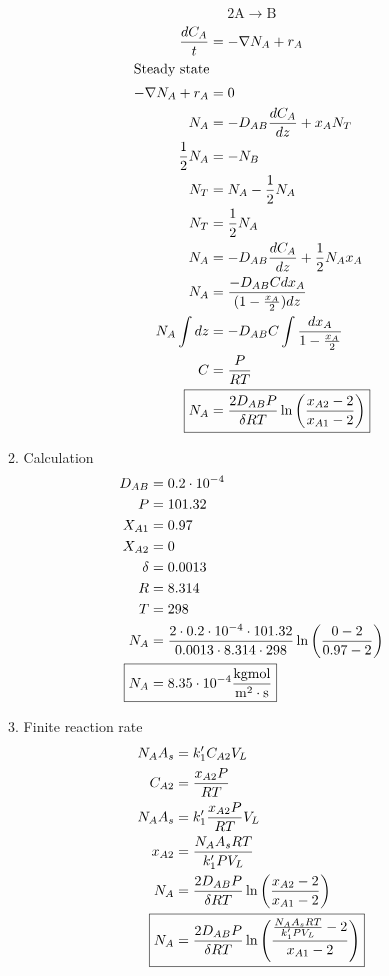 \documentclass[12pt]{article}
\begin{document}
\begin{enumerate}
\begin{enumerate}
        \begin{equation*}
            \mathrm{2A} \rightarrow \mathrm{B}
        \end{equation*}
        \begin{align*}
            \frac{d C_A}{t} &= -\nabla N_A + r_A \\
            \intertext{Steady state}
            -\nabla N_A + r_A &= 0 \\
            N_A &= -D_{AB}\frac{d C_A}{dz} + x_A N_T \\
            \frac{1}{2} N_A &= -N_B \\
            N_T &= N_A - \frac{1}{2} N_A \\
            N_T &= \frac{1}{2} N_A \\
            N_A &= -D_{AB}\frac{d C_A}{dz} + \frac{1}{2} N_A x_A \\
            N_A &= \frac{-D_{AB} C dx_A}{(1-\frac{x_A}{2}) dz} \\
            N_A \int dz &= -D_{AB} C \int \frac{dx_A}{1-\frac{x_A}{2}} \\
            C &= \frac{P}{RT} \\
            \Aboxed{N_A &= \frac{2 D_{AB} P}{\delta R T} \ln\left( \frac{x_{A2} - 2}{x_{A1} - 2} \right)}
        \end{align*}
        
        \item Calculation
        \begin{align*}
            D_{AB} &= 0.2 \cdot 10^{-4} \\
            P &= 101.32 \\
            X_{A1} &= 0.97 \\
            X_{A2} &= 0 \\
            \delta &= 0.0013 \\
            R &= 8.314 \\
            T &= 298 \\
            N_A &= \frac{2 \cdot 0.2 \cdot 10^{-4} \cdot 101.32}{0.0013 \cdot 8.314 \cdot 298} \ln\left( \frac{0 - 2}{0.97 - 2} \right) \\
            \Aboxed{N_A &= 8.35 \cdot 10^{-4}\mathrm{\frac{kgmol}{m^2 \cdot s}}}
        \end{align*}

        \item Finite reaction rate
        \begin{align*}
            N_A A_s &= k_1' C_{A2} V_L \\
            C_{A2} &= \frac{x_{A2} P}{RT} \\
            N_A A_s &= k_1' \frac{x_{A2} P}{RT} V_L \\
            x_{A2} &= \frac{N_A A_s RT}{k_1' P V_L} \\
            N_A &= \frac{2 D_{AB} P}{\delta R T} \ln\left( \frac{x_{A2} - 2}{x_{A1} - 2} \right) \\
            \Aboxed{N_A &= \frac{2 D_{AB} P}{\delta R T} \ln\left( \frac{\frac{N_A A_s RT}{k_1' P V_L} - 2}{x_{A1} - 2} \right)}
        \end{align*}


\end{enumerate}
\end{enumerate}
\end{document}
